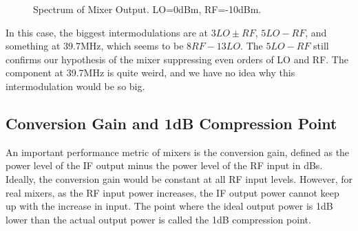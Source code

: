 \documentclass{article}
\begin{document}
\begin{figure}[h]
    \centering
    \caption{Spectrum of Mixer Output. LO=0dBm, RF=-10dBm.}
    \label{fig:mixer_out_2}
\end{figure}

In this case, the biggest intermodulations are at $3LO\pm RF$, $5LO-RF$, and something at 39.7MHz, which seems to be $8RF-13LO$.
The $5LO-RF$ still confirms our hypothesis of the mixer suppressing even orders of LO and RF.
The component at 39.7MHz is quite weird, and we have no idea why this intermodulation would be so big.

\subsection{Conversion Gain and 1dB Compression Point}
An important performance metric of mixers is the conversion gain, defined as the power level of the IF output minus the power level of the RF input in dBs.
Ideally, the conversion gain would be constant at all RF input levels.
However, for real mixers, as the RF input power increases, the IF output power cannot keep up with the increase in input.
The point where the ideal output power is 1dB lower than the actual output power is called the 1dB compression point.
\end{document}
